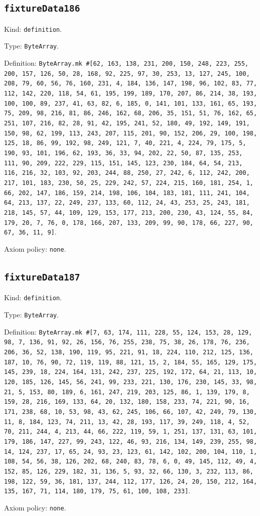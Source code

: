 \documentclass[11pt]{article}
\begin{document}
\subsection*{\texttt{fixtureData186}}
\noindent Kind: \texttt{definition}.\par
\noindent Type: \texttt{ByteArray}.\par
\noindent Definition: \texttt{ByteArray.mk \#[62, 163, 138, 231, 200, 150, 248, 223, 255, 200, 157, 126, 50, 28, 168, 92, 225, 97, 30, 253, 13, 127, 245, 100, 208, 79, 60, 56, 76, 160, 231, 4, 184, 136, 147, 198, 96, 102, 83, 77, 112, 142, 220, 118, 54, 61, 195, 199, 189, 170, 207, 86, 214, 38, 193, 100, 100, 89, 237, 41, 63, 82, 6, 185, 0, 141, 101, 133, 161, 65, 193, 75, 209, 98, 216, 81, 86, 246, 162, 68, 206, 35, 151, 51, 76, 162, 65, 251, 107, 216, 82, 28, 91, 42, 195, 241, 52, 180, 49, 192, 149, 191, 150, 98, 62, 199, 113, 243, 207, 115, 201, 90, 152, 206, 29, 100, 198, 125, 18, 86, 99, 192, 98, 249, 121, 7, 40, 221, 4, 224, 79, 175, 5, 190, 93, 101, 196, 62, 193, 36, 33, 94, 202, 22, 50, 87, 135, 253, 111, 90, 209, 222, 229, 115, 151, 145, 123, 230, 184, 64, 54, 213, 116, 216, 32, 103, 92, 203, 244, 88, 250, 27, 242, 6, 112, 242, 200, 217, 101, 183, 230, 50, 25, 229, 242, 57, 224, 215, 160, 181, 254, 1, 66, 202, 147, 186, 159, 214, 198, 106, 104, 183, 181, 111, 241, 104, 64, 213, 137, 22, 249, 237, 133, 60, 112, 24, 43, 253, 25, 243, 181, 218, 145, 57, 44, 109, 129, 153, 177, 213, 200, 230, 43, 124, 55, 84, 179, 20, 7, 76, 0, 178, 166, 207, 133, 209, 99, 90, 178, 66, 227, 90, 67, 36, 11, 9]}.\par
\noindent Axiom policy: \texttt{none}.\par
\subsection*{\texttt{fixtureData187}}
\noindent Kind: \texttt{definition}.\par
\noindent Type: \texttt{ByteArray}.\par
\noindent Definition: \texttt{ByteArray.mk \#[7, 63, 174, 111, 228, 55, 124, 153, 28, 129, 98, 7, 136, 91, 92, 26, 156, 76, 255, 238, 75, 38, 26, 178, 76, 236, 206, 36, 52, 138, 190, 119, 95, 221, 91, 18, 224, 110, 212, 125, 136, 187, 10, 76, 90, 72, 119, 119, 88, 121, 15, 2, 184, 55, 165, 129, 175, 145, 239, 18, 224, 164, 131, 242, 237, 225, 192, 172, 64, 21, 113, 10, 120, 185, 126, 145, 56, 241, 99, 233, 221, 130, 176, 230, 145, 33, 98, 21, 5, 153, 80, 189, 6, 161, 247, 219, 203, 125, 86, 1, 139, 179, 8, 159, 28, 216, 169, 133, 64, 20, 132, 180, 158, 233, 74, 221, 90, 16, 171, 238, 68, 10, 53, 98, 43, 62, 245, 106, 66, 107, 42, 249, 79, 130, 11, 8, 184, 123, 74, 211, 13, 42, 28, 193, 117, 39, 249, 118, 4, 52, 70, 211, 244, 4, 213, 44, 66, 222, 119, 59, 1, 251, 137, 131, 63, 101, 179, 186, 147, 227, 99, 243, 122, 46, 93, 216, 134, 149, 239, 255, 98, 14, 124, 237, 17, 65, 24, 93, 23, 123, 61, 142, 102, 200, 104, 110, 1, 108, 54, 56, 38, 126, 202, 68, 240, 83, 78, 6, 0, 49, 145, 112, 49, 4, 152, 85, 126, 229, 182, 31, 136, 5, 93, 32, 66, 130, 3, 232, 113, 86, 198, 122, 59, 36, 181, 137, 244, 112, 177, 126, 24, 20, 150, 212, 164, 135, 167, 71, 114, 180, 179, 75, 61, 100, 108, 233]}.\par
\noindent Axiom policy: \texttt{none}.\par
\end{document}
